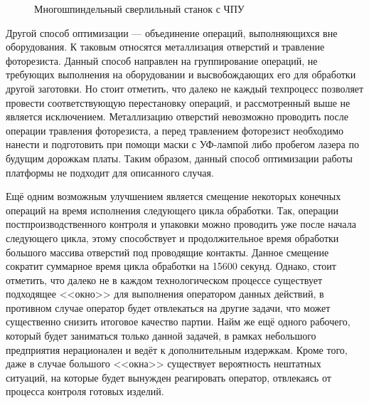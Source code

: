 \begin{figure}[ht]
	\caption{Многошпиндельный сверлильный станок с ЧПУ}\label{fig:multi-sp}
\end{figure}

Другой способ оптимизации --- объединение операций, выполняющихся вне оборудования. К таковым относятся металлизация отверстий и травление фоторезиста. Данный способ направлен на группирование операций, не требующих выполнения на оборудовании и высвобождающих его для обработки другой заготовки. Но стоит отметить, что далеко не каждый техпроцесс позволяет провести соответствующую перестановку операций, и рассмотренный выше не является исключением. Металлизацию отверстий невозможно проводить после операции травления фоторезиста, а перед травлением фоторезист необходимо нанести и подготовить при помощи маски с УФ-лампой либо пробегом лазера по будущим дорожкам платы. Таким образом, данный способ оптимизации работы платформы не подходит для описанного случая.

Ещё одним возможным улучшением является смещение некоторых конечных операций на время исполнения следующего цикла обработки. Так, операции постпроизводственного контроля и упаковки можно проводить уже после начала следующего цикла, этому способствует и продолжительное время обработки большого массива отверстий под проводящие контакты. Данное смещение сократит суммарное время цикла обработки на 15600 секунд. Однако, стоит отметить, что далеко не в каждом технологическом процессе существует подходящее <<окно>> для выполнения оператором данных действий, в противном случае оператор будет отвлекаться на другие задачи, что может существенно снизить итоговое качество партии. Найм же ещё одного рабочего, который будет заниматься только данной задачей, в рамках небольшого предприятия нерационален и ведёт к дополнительным издержкам. Кроме того, даже в случае большого <<окна>> существует вероятность нештатных ситуаций, на которые будет вынужден реагировать оператор, отвлекаясь от процесса контроля готовых изделий.

